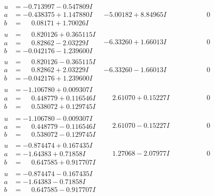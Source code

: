 \documentclass[1p]{elsarticle_modified}
\theoremstyle{definition}
\begin{document}
$$\begin{array}{c|c|c}
\begin{aligned}
u &= -0.713997 - 0.547809 I \\
a &= -0.438375 + 1.147880 I \\
b &= \phantom{-}0.08171 + 1.70026 I\end{aligned}
 & -5.00182 + 8.84965 I & \phantom{-0.000000 } 0 \\ \hline\begin{aligned}
u &= \phantom{-}0.820126 + 0.365115 I \\
a &= \phantom{-}0.82862 - 2.03229 I \\
b &= -0.042176 - 1.239600 I\end{aligned}
 & -6.33260 + 1.66013 I & \phantom{-0.000000 } 0 \\ \hline\begin{aligned}
u &= \phantom{-}0.820126 - 0.365115 I \\
a &= \phantom{-}0.82862 + 2.03229 I \\
b &= -0.042176 + 1.239600 I\end{aligned}
 & -6.33260 - 1.66013 I & \phantom{-0.000000 } 0 \\ \hline\begin{aligned}
u &= -1.106780 + 0.009307 I \\
a &= \phantom{-}0.448779 + 0.116546 I \\
b &= \phantom{-}0.538072 + 0.129745 I\end{aligned}
 & \phantom{-}2.61070 + 0.15227 I & \phantom{-0.000000 } 0 \\ \hline\begin{aligned}
u &= -1.106780 - 0.009307 I \\
a &= \phantom{-}0.448779 - 0.116546 I \\
b &= \phantom{-}0.538072 - 0.129745 I\end{aligned}
 & \phantom{-}2.61070 - 0.15227 I & \phantom{-0.000000 } 0 \\ \hline\begin{aligned}
u &= -0.874474 + 0.167435 I \\
a &= -1.64383 + 0.71858 I \\
b &= \phantom{-}0.647585 + 0.917707 I\end{aligned}
 & \phantom{-}1.27068 - 2.07977 I & \phantom{-0.000000 } 0 \\ \hline\begin{aligned}
u &= -0.874474 - 0.167435 I \\
a &= -1.64383 - 0.71858 I \\
b &= \phantom{-}0.647585 - 0.917707 I\end{aligned}

\end{array}$$
\end{document}
